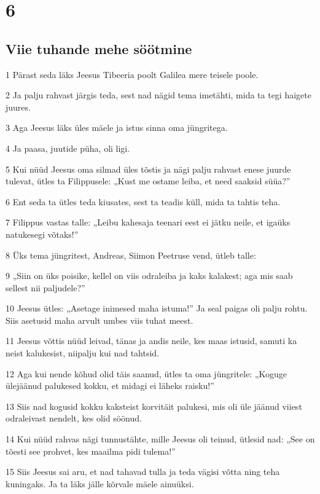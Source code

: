 \chapter{6}

\section*{Viie tuhande mehe söötmine}

\par 1 Pärast seda läks Jeesus Tibeeria poolt Galilea mere teisele poole.
\par 2 Ja palju rahvast järgis teda, sest nad nägid tema imetähti, mida ta tegi haigete juures.
\par 3 Aga Jeesus läks üles mäele ja istus sinna oma jüngritega.
\par 4 Ja paasa, juutide püha, oli ligi.
\par 5 Kui nüüd Jeesus oma silmad üles tõstis ja nägi palju rahvast enese juurde tulevat, ütles ta Filippusele: „Kust me ostame leiba, et need saaksid süüa?”
\par 6 Ent seda ta ütles teda kiusates, sest ta teadis küll, mida ta tahtis teha.
\par 7 Filippus vastas talle: „Leibu kahesaja teenari eest ei jätku neile, et igaüks natukesegi võtaks!”
\par 8 Üks tema jüngritest, Andreas, Siimon Peetruse vend, ütleb talle:
\par 9 „Siin on üks poisike, kellel on viis odraleiba ja kaks kalakest; aga mis saab sellest nii paljudele?”
\par 10 Jeesus ütles: „Asetage inimesed maha istuma!” Ja seal paigas oli palju rohtu. Siis asetusid maha arvult umbes viis tuhat meest.
\par 11 Jeesus võttis nüüd leivad, tänas ja andis neile, kes maas istusid, samuti ka neist kalukesist, niipalju kui nad tahtsid.
\par 12 Aga kui nende kõhud olid täis saanud, ütles ta oma jüngritele: „Koguge ülejäänud palukesed kokku, et midagi ei läheks raisku!”
\par 13 Siis nad kogusid kokku kaksteist korvitäit palukesi, mis oli üle jäänud viiest odraleivast nendelt, kes olid söönud.
\par 14 Kui nüüd rahvas nägi tunnustähte, mille Jeesus oli teinud, ütlesid nad: „See on tõesti see prohvet, kes maailma pidi tulema!”
\par 15 Siis Jeesus sai aru, et nad tahavad tulla ja teda vägisi võtta ning teha kuningaks. Ja ta läks jälle kõrvale mäele ainuüksi.

